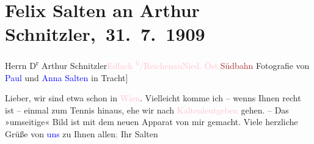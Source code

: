 

\renewcommand{\erwaehntePersonen}{Personen: Anna Katharina Rehmann, Felix Salten, Paul Salten, Ottilie Salten}
\renewcommand{\erwaehnteInstitutionen}{Institutionen: Südbahnstrecke}
\renewcommand{\erwaehnteOrte}{Orte: Edlach, Höhlenstein, Kaltenleutgeben, Niederösterreich, Wien}
\renewcommand{\erwaehnteWerke}{}
\section[ Felix Salten an Arthur Schnitzler, 31. 7. 1909]{Felix Salten an Arthur Schnitzler, 31. 7. 1909}
\nopagebreak{}
\rehead{ }\normalsize\beginnumbering{}
\toendnotes[C]{\smallbreak\pagebreak[2]}
\toendnotes[C]{\smallbreak}\pstart{}{\pb}Herrn D\textsuperscript{r} Arthur Schnitzler\pend{}\pstart{}\textcolor{pink}{Edlach \textsuperscript{b}/Reichenau}{}\ledrightnote{\textcolor{pink}{Edlach}}\pend{}\pstart{}\textcolor{pink}{Nied. Öst.}{}\ledrightnote{\textcolor{pink}{Niederösterreich}}\pend{}\pstart{}\textcolor{brown}{Südbahn}{}\ledrightnote{\textcolor{brown}{Südbahnstrecke}}\pend{}
{\bigskip}
\pstart
           \noindent{}\centering{}{\pb}{[}Fotografie von \textcolor{blue}{Paul}{}\ledrightnote{\textcolor{blue}{Paul Salten}} und \textcolor{blue}{Anna Salten}{}\ledrightnote{\textcolor{blue}{Anna Katharina Rehmann}} in
                     Tracht{]}\pend
           
\pstart
           {\pb}Lieber, wir
               sind etwa \label{K_L03505-1v}\label{K_L03505-1h} schon in \textcolor{pink}{Wien}{}\ledrightnote{\textcolor{pink}{Wien}}. Vielleicht
               komme ich – wenns Ihnen recht ist – einmal zum Tennis hinaus, ehe wir nach \textcolor{pink}{Kaltenleutgeben}{}\ledrightnote{\textcolor{pink}{Kaltenleutgeben}} gehen. – Das »umseitige« Bild
               ist mit dem neuen Apparat von mir gemacht. Viele herzliche Grüße von \textcolor{blue}{uns}{}\ledrightnote{{$\rightarrow$}\textcolor{blue}{Ottilie Salten}} zu Ihnen
                  allen\textcolor{gray}{;} Ihr \spacefill\mbox{Salten}\pend
           
